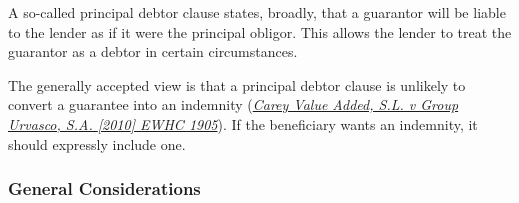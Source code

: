 \documentclass[
]{article}
\begin{document}
A so-called principal debtor clause states, broadly, that a guarantor
will be liable to the lender as if it were the principal obligor. This
allows the lender to treat the guarantor as a debtor in certain
circumstances.

The generally accepted view is that a principal debtor clause is
unlikely to convert a guarantee into an indemnity
(\emph{\href{https://uk.westlaw.com/D-000-1341?originationContext=document\&transitionType=PLDocumentLink\&contextData=(sc.Default)\&ppcid=31b1b10b11a346b28acbfa5d800fec19}{Carey
Value Added, S.L. v Group Urvasco, S.A. {[}2010{]} EWHC 1905}}). If the
beneficiary wants an indemnity, it should expressly include one.

\hypertarget{general-considerations}{%
\subsubsection{General Considerations}\label{general-considerations}}
\end{document}
